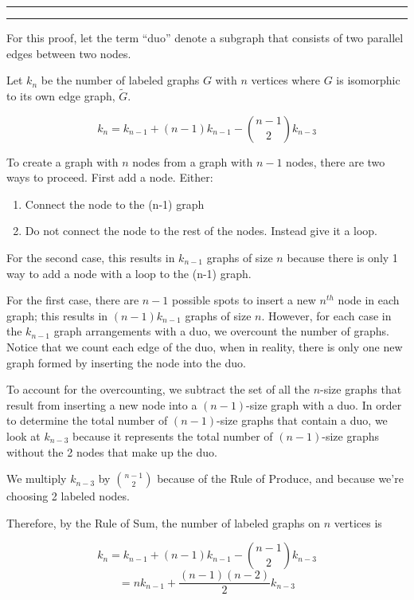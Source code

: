 \documentclass[11pt]{article}
\newcounter{questionCounter}
\newcounter{partCounter}[questionCounter]
\newenvironment{question}[2][\arabic{questionCounter}]{%
    \setcounter{partCounter}{0}%
    \vspace{.25in} \hrule \vspace{0.5em}%
        \noindent{\bf #2}%
    \vspace{0.8em} \hrule \vspace{.10in}%
    \addtocounter{questionCounter}{1}%
}{}
\begin{document}
\begin{question}{Running in Circles}
For this proof, let the term ``duo'' denote a subgraph that consists of two parallel edges between two nodes.

Let $k_{n}$ be the number of labeled graphs $G$ with $n$ vertices where $G$ is isomorphic to its own edge graph, $\widetilde{G}$. 

$$k_n = k_{n-1} + (n-1)k_{n-1} - \binom{n-1}{2}k_{n-3}$$

To create a graph with $n$ nodes from a graph with $n-1$ nodes, there are two ways to proceed. First add a node.
Either:
\begin{enumerate}
\item Connect the node to the (n-1) graph
\item Do not connect the node to the rest of the nodes. Instead give it a loop.
\end{enumerate}

For the second case, this results in $k_{n-1}$ graphs of size $n$ because there is only 1 way to add
a node with a loop to the (n-1) graph.

For the first case, there are $n-1$ possible spots to insert a new $n^{th}$ node in each graph; this 
results in $(n-1)k_{n-1}$ graphs of size $n$. However, for each case in the $k_{n-1}$ graph arrangements with a duo,
we overcount the number of graphs. Notice that we count each edge of the duo, when in reality, there is only one 
new graph formed by inserting the node into the duo.

To account for the overcounting, we subtract the set of all the $n$-size graphs that result 
from inserting a new node into a $(n-1)$-size graph with a duo. In order to determine the 
total number of $(n-1)$-size graphs that contain a duo, we look at $k_{n-3}$ because it represents the 
total number of $(n-1)$-size graphs without the 2 nodes that make up the duo.

We multiply $k_{n-3}$ by $\binom{n-1}{2}$ because of the Rule of Produce, and because we're choosing 2 labeled
nodes. 

Therefore, by the Rule of Sum, the number of labeled graphs on $n$ vertices is 

$$k_n = k_{n-1} + (n-1)k_{n-1} - \binom{n-1}{2}k_{n-3}$$
$$= nk_{n-1} + \frac{(n-1)(n-2)}{2}k_{n-3}$$ 

\end{question}
\end{document}
